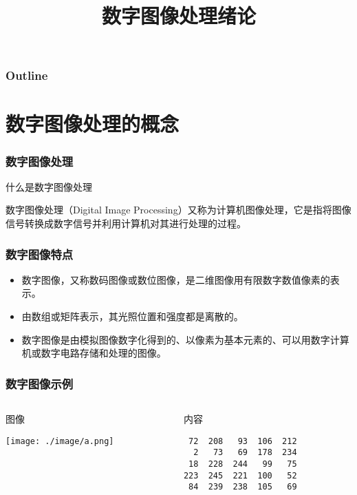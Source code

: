 \documentclass{beamer}
\title{数字图像处理绪论}
\author{}
\date{}
\begin{document}
\maketitle

\begin{frame}
\frametitle{Outline}
\setcounter{tocdepth}{3}
\tableofcontents
\end{frame}













\section{数字图像处理的概念}
\label{sec-1}
\begin{frame}
\frametitle{数字图像处理}
\label{sec-1-1}
\begin{block}{什么是数字图像处理}
\label{sec-1-1-1}

数字图像处理（Digital Image Processing）又称为计算机图像处理，它是指将图像信号转换成数字信号并利用计算机对其进行处理的过程。
\end{block}
\end{frame}
\begin{frame}
\frametitle{数字图像特点}
\label{sec-1-2}

\begin{itemize}
\item 数字图像，又称数码图像或数位图像，是二维图像用有限数字数值像素的表示。
\item 由数组或矩阵表示，其光照位置和强度都是离散的。
\item 数字图像是由模拟图像数字化得到的、以像素为基本元素的、可以用数字计算机或数字电路存储和处理的图像。
\end{itemize}
\end{frame}
\begin{frame}[fragile]
\frametitle{数字图像示例}
\label{sec-1-3}
\begin{columns}
\begin{column}{0.5\textwidth}
\begin{block}{图像}
\label{sec-1-3-1}

\texttt{[image: ./image/a.png]}
\end{block}
\end{column}
\begin{column}{0.5\textwidth}
\begin{block}{内容}
\label{sec-1-3-2}


\begin{verbatim}
 72  208   93  106  212
  2   73   69  178  234
 18  228  244   99   75
223  245  221  100   52
 84  239  238  105   69
\end{verbatim}
\end{block}
\end{column}
\end{columns}
\end{frame}
\end{document}
